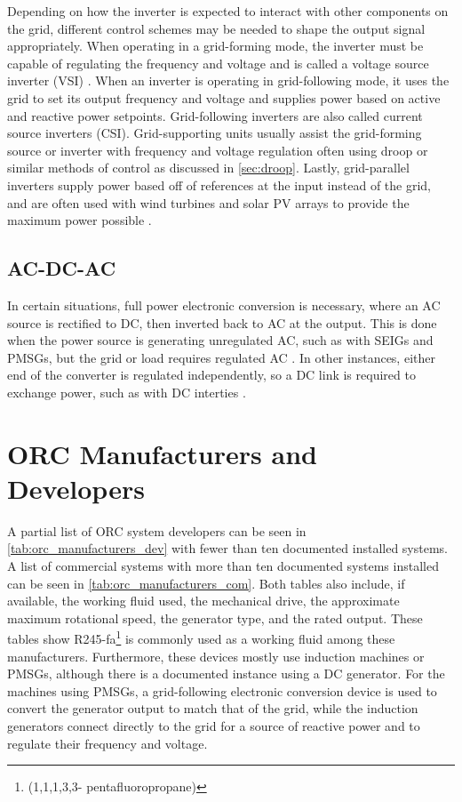 Depending on how the inverter is expected to interact with other components on the grid, different control schemes may be needed to shape the output signal appropriately. When operating in a grid-forming mode, the inverter must be capable of regulating the frequency and voltage and is called a voltage source inverter (VSI) \cite{Engler}. When an inverter is operating in grid-following mode, it uses the grid to set its output frequency and voltage and supplies power based on active and reactive power setpoints. Grid-following inverters are also called current source inverters (CSI). Grid-supporting units usually assist the grid-forming source or inverter with frequency and voltage regulation often using droop or similar methods of control as discussed in \autoref{sec:droop}. Lastly, grid-parallel inverters supply power based off of references at the input instead of the grid, and are often used with wind turbines and solar PV arrays to provide the maximum power possible \cite{Mohd2009}.

\subsection{AC-DC-AC}
In certain situations, full power electronic conversion is necessary, where an AC source is rectified to DC, then inverted back to AC at the output. This is done when the power source is generating unregulated AC, such as with SEIGs and PMSGs, but the grid or load requires regulated AC \cite{ALOLAH1994111, Seung-HoSong2003}. In other instances, either end of the converter is regulated independently, so a DC link is required to exchange power, such as with DC interties \cite{Okada}.

\section{ORC Manufacturers and Developers}
A partial list of ORC system developers can be seen in \autoref{tab:orc_manufacturers_dev} with fewer than ten documented installed systems. A list of commercial systems with more than ten documented systems installed can be seen in \autoref{tab:orc_manufacturers_com}. Both tables also include, if available, the working fluid used, the mechanical drive, the approximate maximum rotational speed, the generator type, and the rated output. These tables show R245-fa\footnote{ (1,1,1,3,3- pentafluoropropane)} is commonly used as a working fluid among these manufacturers. Furthermore, these devices mostly use induction machines or PMSGs, although there is a documented instance using a DC generator. For the machines using PMSGs, a grid-following electronic conversion device is used to convert the generator output to match that of the grid, while the induction generators connect directly to the grid for a source of reactive power and to regulate their frequency and voltage.
 

\cleardoublepage